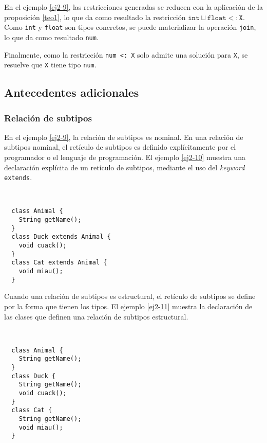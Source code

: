 En el ejemplo \ref{ej2-9}, las restricciones generadas se reducen con la aplicación de la proposición \ref{teo1}, lo que da como resultado la restricción $\mathtt{int\sqcup float <: X}$. Como \texttt{int} y \texttt{float} son tipos concretos, se puede materializar la operación \texttt{join}, lo que da como resultado \texttt{num}.

Finalmente, como la restricción \texttt{num <: X} solo admite una solución para \texttt{X}, se resuelve que \texttt{X} tiene tipo \texttt{num}.

\subsection*{Antecedentes adicionales}

\subsubsection*{Relación de subtipos}

En el ejemplo \ref{ej2-9}, la relación de subtipos es nominal. En una relación de subtipos nominal, el retículo de subtipos es definido explícitamente por el programador o el lenguaje de programación. El ejemplo \ref{ej2-10} muestra una declaración explícita de un retículo de subtipos, mediante el uso del \emph{keyword} \texttt{extends}.

\begin{ej} \ \\
  \normalfont
  \label{ej2-10}
\begin{lstlisting}
  class Animal {
    String getName();
  }
  class Duck extends Animal {
    void cuack();
  }
  class Cat extends Animal {
    void miau();
  }
\end{lstlisting}
\end{ej}

Cuando una relación de subtipos es estructural, el retículo de subtipos se define por la forma que tienen los tipos. El ejemplo \ref{ej2-11} muestra la declaración de las clases que definen una relación de subtipos estructural.

\begin{ej} \ \\
  \normalfont
  \label{ej2-11}
\begin{lstlisting}
  class Animal {
    String getName();
  }
  class Duck {
    String getName();
    void cuack();
  }
  class Cat {
    String getName();
    void miau();
  }
\end{lstlisting}
\end{ej}


